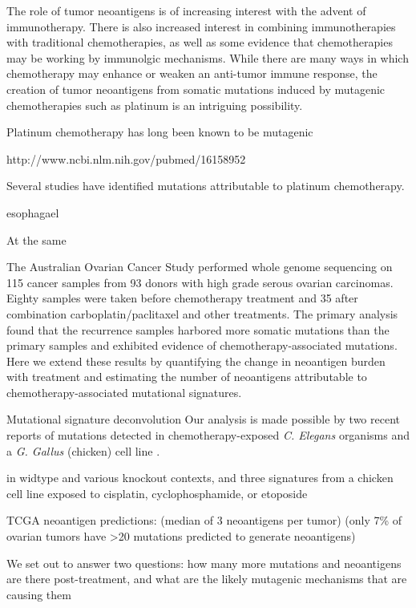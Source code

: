The role of tumor neoantigens is of increasing interest with the advent of immunotherapy. There is also increased interest in combining immunotherapies with traditional chemotherapies, as well as some evidence that chemotherapies may be working by immunolgic mechanisms. While there are many ways in which chemotherapy may enhance or weaken\cite{Litterman_2013} an anti-tumor immune response, the creation of tumor neoantigens from somatic mutations induced by mutagenic chemotherapies such as platinum is an intriguing possibility.

Platinum chemotherapy has long been known to be mutagenic

http://www.ncbi.nlm.nih.gov/pubmed/16158952


Several studies have identified mutations attributable to platinum chemotherapy\cite{Murugaesu_2015}. 

esophagael

At the same 


The Australian Ovarian Cancer Study performed whole genome sequencing on 115 cancer samples from 93 donors with high grade serous ovarian carcinomas\cite{Patch_2015}. Eighty samples were taken before chemotherapy treatment and 35 after combination carboplatin/paclitaxel and other treatments. The primary analysis found that the recurrence samples harbored more somatic mutations than the primary samples and exhibited evidence of chemotherapy-associated mutations. Here we extend these results by quantifying the change in neoantigen burden with treatment and estimating the number of neoantigens attributable to chemotherapy-associated mutational signatures.

Mutational signature deconvolution Our analysis is made possible by two recent reports of mutations detected in chemotherapy-exposed \textit{C. Elegans} organisms\cite{Meier_2014} and a \textit{G. Gallus} (chicken) cell line \cite{Szikriszt_2016}.

in widtype and various knockout contexts, and three signatures from a chicken cell line exposed to cisplatin, cyclophosphamide, or etoposide


TCGA neoantigen predictions: \cite{Brown_2014} (median of 3 neoantigens per tumor) \cite{Rooney_2015} (only 7\% of ovarian tumors have >20 mutations predicted to generate neoantigens)


We set out to answer two questions: how many more mutations and neoantigens are there post-treatment, and what are the likely mutagenic mechanisms that are causing them

